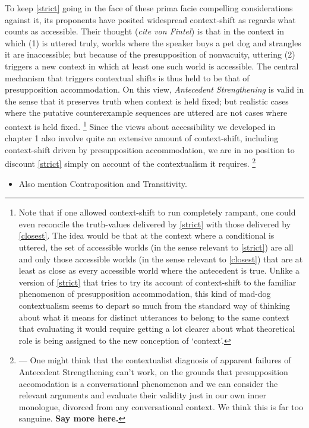 \documentclass[If.tex]{subfiles}
\begin{document}
To keep \ref{strict} going in the face of these prima facie compelling considerations against it, its proponents have posited widespread context-shift as regards what counts as accessible. Their thought (\emph{cite von Fintel}) is that in the context in which (1) is uttered truly, worlds where the speaker buys a pet dog and strangles it are inaccessible; but because of the presupposition of nonvacuity, uttering (2) triggers a new context in which at least one such world is accessible. The central mechanism that triggers contextual shifts is thus held to be that of presupposition accommodation. On this view, \emph{Antecedent Strengthening} is valid in the sense that it preserves truth when context is held fixed; but realistic cases where the putative counterexample sequences are uttered are not cases where context is held fixed.%
\footnote{Note that if one allowed context-shift to run completely rampant, one could even reconcile the truth-values delivered by \ref{strict} with those delivered by \ref{closest}. The idea would be that at the context where a conditional is uttered, the set of accessible worlds (in the sense relevant to \ref{strict}) are all and only those accessible worlds (in the sense relevant to \ref{closest}) that are at least as close as every accessible world where the antecedent is true. Unlike a version of \ref{strict} that tries to try its account of context-shift to the familiar phenomenon of presupposition accommodation, this kind of mad-dog contextualism seems to depart so much from the standard way of thinking about what it means for distinct utterances to belong to the same context that evaluating it would require getting a lot clearer about what theoretical role is being assigned to the new conception of ‘context’.} 
Since the views about accessibility we developed in chapter 1 also involve quite an extensive amount of context-shift, including context-shift driven by presupposition accommodation, we are in no position to discount \ref{strict} simply on account of the contextualism it requires.%
\footnote{--- One might think that the contextualist diagnosis of apparent failures of Antecedent Strengthening can't work, on the grounds that presupposition accomodation is a conversational phenomenon and we can consider the relevant arguments and evaluate their validity just in our own inner monologue, divorced from any conversational context. We think this is far too sanguine. \textbf{Say more here.}}

\begin{itemize}
\item
  Also mention Contraposition and Transitivity.
\end{itemize}
\end{document}
